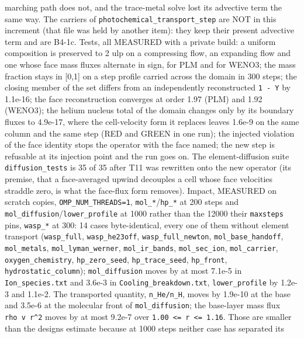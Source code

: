 \documentclass[english,a4paper]{my_memo}
\begin{document}
\begin{itemize}
  marching path does not, and the trace-metal solve lost its advective term
  the same way. The carriers of \texttt{photochemical\_transport\_step} are NOT in this
  increment (that file was held by another item): they keep their present
  advective term and are B4-1c.
  Tests, all MEASURED with a private build: a uniform composition is preserved
  to 2 ulp on a compressing flow, an expanding flow and one whose face mass
  fluxes alternate in sign, for PLM and for WENO3; the mass fraction stays in
  {[}0,1{]} on a step profile carried across the domain in 300 steps; the closing
  member of the set differs from an independently reconstructed \texttt{1\ -\ Y} by
  1.1e-16; the face reconstruction converges at order 1.97 (PLM) and 1.92
  (WENO3); the helium nucleus total of the domain changes only by its boundary
  fluxes to 4.9e-17, where the cell-velocity form it replaces leaves 1.6e-9 on
  the same column and the same step (RED and GREEN in one run); the injected
  violation of the face identity stops the operator with the face named; the
  new step is refusable at its injection point and the run goes on. The
  element-diffusion suite \texttt{diffusion\_tests} is 35 of 35 after T11 was rewritten
  onto the new operator (its premise, that a face-averaged upwind decouples a
  cell whose face velocities straddle zero, is what the face-flux form removes).
  Impact, MEASURED on scratch copies, \texttt{OMP\_NUM\_THREADS=1}, \texttt{mol\_*}/\texttt{hp\_*} at
  200 steps and \texttt{mol\_diffusion}/\texttt{lower\_profile} at 1000 rather than the 12000
  their \texttt{maxsteps} pins, \texttt{wasp\_*} at 300: 14 cases byte-identical, every one of
  them without element transport (\texttt{wasp\_full}, \texttt{wasp\_he23off},
  \texttt{wasp\_full\_newton}, \texttt{mol\_base\_handoff}, \texttt{mol\_metals}, \texttt{mol\_lyman\_werner},
  \texttt{mol\_ir\_bands}, \texttt{mol\_sec\_ion}, \texttt{mol\_carrier}, \texttt{oxygen\_chemistry},
  \texttt{hp\_zero\_seed}, \texttt{hp\_trace\_seed}, \texttt{hp\_front}, \texttt{hydrostatic\_column});
  \texttt{mol\_diffusion} moves by at most 7.1e-5 in \texttt{Ion\_species.txt} and 3.6e-3 in
  \texttt{Cooling\_breakdown.txt}, \texttt{lower\_profile} by 1.2e-3 and 1.1e-2. The
  transported quantity, \texttt{n\_He/n\_H}, moves by 1.9e-10 at the base and 3.5e-6 at
  the molecular front of \texttt{mol\_diffusion}; the base-layer mass flux \texttt{rho\ v\ r\^{}2}
  moves by at most 9.2e-7 over \texttt{1.00\ \textless{}=\ r\ \textless{}=\ 1.16}. Those are smaller than the
  design\textquotesingle s estimate because at 1000 steps neither case has separated its

\end{itemize}
\end{document}

